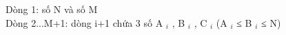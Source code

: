 Dòng 1: số N và số M   
\\   Dòng 2...M+1: dòng i+1 chứa 3 số A   $_    i   $   , B   $_    i   $   , C   $_    i   $   (A   $_    i   $   ≤ B   $_    i   $   ≤ N)